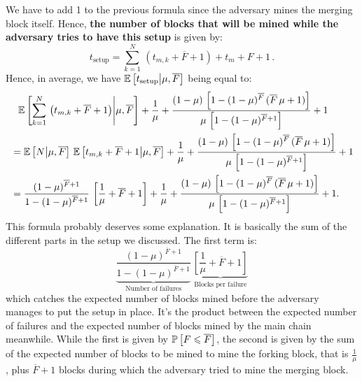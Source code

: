     We have to add 1 to the previous formula since the adversary mines the merging block itself. Hence, \textbf{the number of blocks that will be mined while the adversary tries to have this setup} is given by:
    \[t_{\text{setup}} = \sum_{k=1}^N\,\left(t_{m, k} + \overline{F} + 1\right) + t_m + F + 1\,.\]
    Hence, in average, we have \(\ES{t_{\text{setup}}}{\mu,\overline{F}}\) being equal to:
    \begin{align*}
         &\phantom{=}\ES{\sum_{k=1}^N\,\left(t_{m, k} + \overline{F} + 1\right)}{\mu,\overline{F}}+\frac{1}{\mu}+\frac{(1-\mu)\,\left[1-(1-\mu)^{\overline{F}}\,(\overline{F}\,\mu+1)\right]}{\mu\,\left[1 - (1-\mu)^{\overline{F}+1}\right]} + 1\\
        &=\ES{N}{\mu,\overline{F}}\,\ES{t_{m, k} + \overline{F} + 1}{\mu,\overline{F}}+\frac{1}{\mu}+\frac{(1-\mu)\,\left[1-(1-\mu)^{\overline{F}}\,(\overline{F}\,\mu+1)\right]}{\mu\,\left[1 - (1-\mu)^{\overline{F}+1}\right]} + 1\\
        &=\frac{(1-\mu)^{\overline{F}+1}}{1 - (1-\mu)^{\overline{F}+1}}\,\left[\frac{1}{\mu}+\overline{F} + 1\right] + \frac{1}{\mu} + \frac{(1-\mu)\,\left[1-(1-\mu)^{\overline{F}}\,(\overline{F}\,\mu+1)\right]}{\mu\,\left[1 - (1-\mu)^{\overline{F}+1}\right]} + 1.
    \end{align*}
    This formula probably deserves some explanation. It is basically the sum of the different parts in the setup we discussed. The first term is:
    \[\underbrace{\frac{(1-\mu)^{\overline{F}+1}}{1 - (1-\mu)^{\overline{F}+1}}}_{\text{Number of failures}}\,\underbrace{\left[\frac{1}{\mu}+\overline{F} + 1\right]}_{\text{Blocks per failure}}\]
    which catches the expected number of blocks mined before the adversary manages to put the setup in place. It's the product between the expected number of failures and the expected number of blocks mined by the main chain meanwhile. While the first is given by \(\P{F\leqslant\overline{F}}\), the second is given by the sum of the expected number of blocks to be mined to mine the forking block, that is \(\frac{1}{\mu}\), plus \(\overline{F}+1\) blocks during which the adversary tried to mine the merging block.
    

